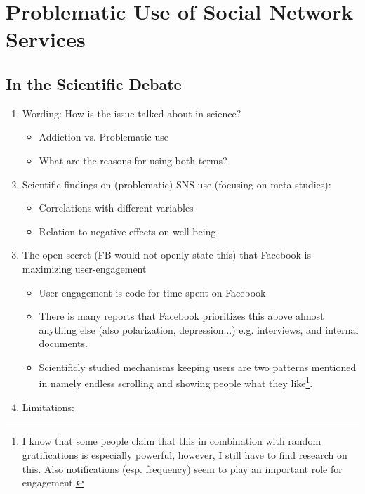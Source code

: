 \section{Problematic Use of Social Network Services}
\label{sec:prob_sns}

\subsection{In the Scientific Debate}
\begin{enumerate}
    \item Wording: How is the issue talked about in science?\begin{itemize}
        \item Addiction vs. Problematic use
        \item What are the reasons for using both terms?
    \end{itemize} 
    \item Scientific findings on (problematic) SNS use (focusing on meta studies): \begin{itemize}
        \item Correlations with different variables
        \item Relation to negative effects on well-being
    \end{itemize} 
    \item The open secret (FB would not openly state this) that Facebook is maximizing user-engagement \begin{itemize}
        \item User engagement is code for time spent on Facebook
        \item There is many reports that Facebook prioritizes this above almost anything else (also polarization, depression...) e.g. interviews, and internal documents.
        \item Scientificly studied mechanisms keeping users  are two patterns mentioned in \citep{montag_addictive_2019} namely endless scrolling and showing people what they like\footnote{I know that some people claim that this in combination with random gratifications is especially powerful, however, I still have to find research on this. Also notifications (esp. frequency) seem to play an important role for engagement.}.
    \end{itemize}
    \item Limitations: \begin{itemize}

\end{itemize}
\end{enumerate}
